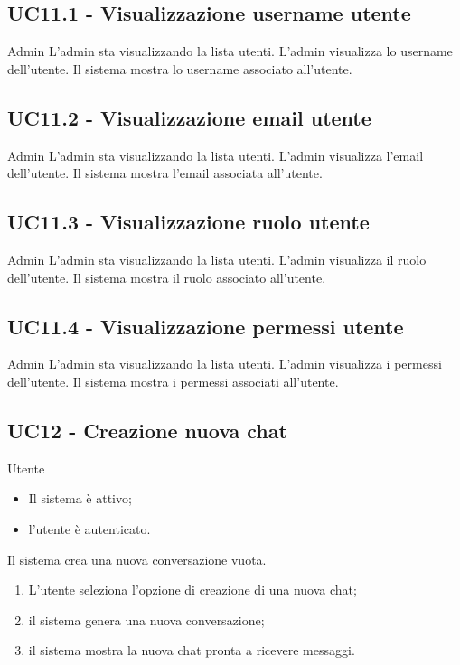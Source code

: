 \subsection{UC11.1 - Visualizzazione username utente}
\label{11.1}
\makeUC{}
{Admin}
{L'admin sta visualizzando la lista utenti.}
{L'admin visualizza lo username dell'utente.}
{Il sistema mostra lo username associato all'utente.}{}{}{}{}
\subsection{UC11.2 - Visualizzazione email utente}
\label{11.2}
\makeUC{}
{Admin}
{L'admin sta visualizzando la lista utenti.}
{L'admin visualizza l'email dell'utente.}
{Il sistema mostra l'email associata all'utente.}{}{}{}{}
\subsection{UC11.3 - Visualizzazione ruolo utente}
\label{11.3}
\makeUC{}
{Admin}
{L'admin sta visualizzando la lista utenti.}
{L'admin visualizza il ruolo dell'utente.}
{Il sistema mostra il ruolo associato all'utente.}{}{}{}{}
\subsection{UC11.4 - Visualizzazione permessi utente}
\label{11.4}
\makeUC{}
{Admin}
{L'admin sta visualizzando la lista utenti.}
{L'admin visualizza i permessi dell'utente.}
{Il sistema mostra i permessi associati all'utente.}{}{}{}{}

\subsection{UC12 - Creazione nuova chat}
\label{12}
{Utente}
{
    \begin{itemize}
        \item Il sistema è attivo;
        \item l'utente è autenticato.
    \end{itemize}
}
{Il sistema crea una nuova conversazione vuota.}
{
    \begin{enumerate}
        \item L'utente seleziona l'opzione di creazione di una nuova chat;
        \item il sistema genera una nuova conversazione;
        \item il sistema mostra la nuova chat pronta a ricevere messaggi.
    \end{enumerate}
}
{}{}{}{}


